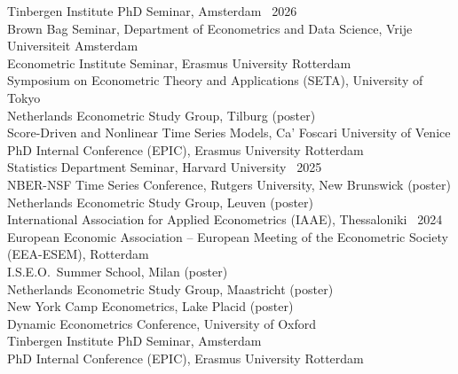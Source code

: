 \documentclass[11pt,a4paper]{article}
\newlength{\lblw}\setlength{\lblw}{2.9cm}
\newlength{\lblgap}\setlength{\lblgap}{0.5cm}
\newenvironment{cvsec}[1]{%
  \par\addvspace{11pt}\needspace{3\baselineskip}%
  \noindent\llap{\smash{\parbox[t]{\lblw}{\raggedright\textsc{#1}}}\hspace*{\lblgap}}%
  \ignorespaces}{\par}
\newcommand{\yr}[1]{\unskip\ \hfill\mbox{#1}}
\begin{document}
\begin{cvsec}{Presentations}
Tinbergen Institute PhD Seminar, Amsterdam \yr{2026}\\
Brown Bag Seminar, Department of Econometrics and Data Science, Vrije Universiteit Amsterdam\\
Econometric Institute Seminar, Erasmus University Rotterdam\\
Symposium on Econometric Theory and Applications (SETA), University of Tokyo\\
Netherlands Econometric Study Group, Tilburg (poster)\\
Score-Driven and Nonlinear Time Series Models, Ca' Foscari University of Venice\\
PhD Internal Conference (EPIC), Erasmus University Rotterdam\\[4pt]
Statistics Department Seminar, Harvard University \yr{2025}\\
NBER-NSF Time Series Conference, Rutgers University, New Brunswick (poster)\\
Netherlands Econometric Study Group, Leuven (poster)\\[4pt]
International Association for Applied Econometrics (IAAE), Thessaloniki \yr{2024}\\
European Economic Association -- European Meeting of the Econometric Society (EEA-ESEM), Rotterdam\\
I.S.E.O.\ Summer School, Milan (poster)\\
Netherlands Econometric Study Group, Maastricht (poster)\\
New York Camp Econometrics, Lake Placid (poster)\\
Dynamic Econometrics Conference, University of Oxford\\
Tinbergen Institute PhD Seminar, Amsterdam\\
PhD Internal Conference (EPIC), Erasmus University Rotterdam
\end{cvsec}
\end{document}
